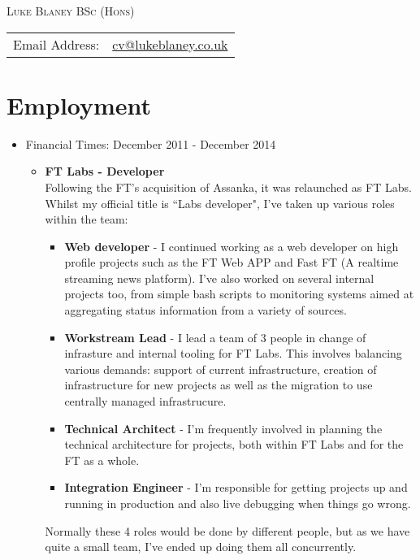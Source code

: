 \documentclass[a4paper]{article}
\begin{document}
\begin{center}\textsc{\LARGE Luke Blaney BSc (Hons)}\end{center}

\begin{tabular}{ l l }

Email Address: & \href{mailto:cv@lukeblaney.co.uk}{cv@lukeblaney.co.uk}\\

\end{tabular}

\section*{Employment}


\begin{itemize}

\item Financial Times: December 2011 - December 2014
\begin{itemize}\item
 {\bf FT Labs - Developer}\\
Following the FT's acquisition of Assanka, it was relaunched as FT Labs.  Whilst my official title is ``Labs developer", I've taken up various roles within the team:
	\begin{itemize}
		\item {\bf Web developer} - I continued working as a web developer on high profile projects such as the FT Web APP and Fast FT (A realtime streaming news platform).  I've also worked on several internal projects too, from simple bash scripts to monitoring systems aimed at aggregating status information from a variety of sources.
		\item {\bf Workstream Lead} - I lead a team of 3 people in change of infrasture and internal tooling for FT Labs.  This involves balancing various demands: support of current infrastructure, creation of infrastructure for new projects as well as the migration to use centrally managed infrastrucure.
		\item {\bf Technical Architect} - I'm frequently involved in planning the technical architecture for projects, both within FT Labs and for the FT as a whole.
		\item {\bf Integration Engineer} - I'm responsible for getting projects up and running in production and also live debugging when things go wrong.
	\end{itemize}
Normally these 4 roles would be done by different people, but as we have quite a small team, I've ended up doing them all concurrently.
\end{itemize}


\end{itemize}
\end{document}

